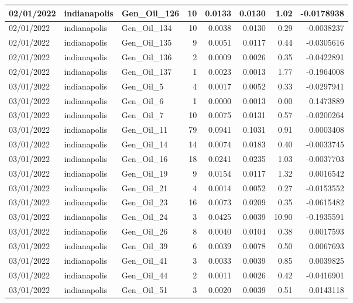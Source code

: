 \documentclass[
  letterpaper,
  DIV=11,
  numbers=noendperiod]{scrartcl}
\begin{document}
\begin{tabular}{l|l|l|r|r|r|r|r}
\hline
02/01/2022 & indianapolis & Gen\_Oil\_126 & 10 & 0.0133 & 0.0130 & 1.02 & -0.0178938\\
\hline
02/01/2022 & indianapolis & Gen\_Oil\_134 & 10 & 0.0038 & 0.0130 & 0.29 & -0.0038237\\
\hline
02/01/2022 & indianapolis & Gen\_Oil\_135 & 9 & 0.0051 & 0.0117 & 0.44 & -0.0305616\\
\hline
02/01/2022 & indianapolis & Gen\_Oil\_136 & 2 & 0.0009 & 0.0026 & 0.35 & -0.0422891\\
\hline
02/01/2022 & indianapolis & Gen\_Oil\_137 & 1 & 0.0023 & 0.0013 & 1.77 & -0.1964008\\
\hline
03/01/2022 & indianapolis & Gen\_Oil\_5 & 4 & 0.0017 & 0.0052 & 0.33 & -0.0297941\\
\hline
03/01/2022 & indianapolis & Gen\_Oil\_6 & 1 & 0.0000 & 0.0013 & 0.00 & 0.1473889\\
\hline
03/01/2022 & indianapolis & Gen\_Oil\_7 & 10 & 0.0075 & 0.0131 & 0.57 & -0.0200264\\
\hline
03/01/2022 & indianapolis & Gen\_Oil\_11 & 79 & 0.0941 & 0.1031 & 0.91 & 0.0003408\\
\hline
03/01/2022 & indianapolis & Gen\_Oil\_14 & 14 & 0.0074 & 0.0183 & 0.40 & -0.0033745\\
\hline
03/01/2022 & indianapolis & Gen\_Oil\_16 & 18 & 0.0241 & 0.0235 & 1.03 & -0.0037703\\
\hline
03/01/2022 & indianapolis & Gen\_Oil\_19 & 9 & 0.0154 & 0.0117 & 1.32 & 0.0016542\\
\hline
03/01/2022 & indianapolis & Gen\_Oil\_21 & 4 & 0.0014 & 0.0052 & 0.27 & -0.0153552\\
\hline
03/01/2022 & indianapolis & Gen\_Oil\_23 & 16 & 0.0073 & 0.0209 & 0.35 & -0.0615482\\
\hline
03/01/2022 & indianapolis & Gen\_Oil\_24 & 3 & 0.0425 & 0.0039 & 10.90 & -0.1935591\\
\hline
03/01/2022 & indianapolis & Gen\_Oil\_26 & 8 & 0.0040 & 0.0104 & 0.38 & 0.0017593\\
\hline
03/01/2022 & indianapolis & Gen\_Oil\_39 & 6 & 0.0039 & 0.0078 & 0.50 & 0.0067693\\
\hline
03/01/2022 & indianapolis & Gen\_Oil\_41 & 3 & 0.0033 & 0.0039 & 0.85 & 0.0039825\\
\hline
03/01/2022 & indianapolis & Gen\_Oil\_44 & 2 & 0.0011 & 0.0026 & 0.42 & -0.0416901\\
\hline
03/01/2022 & indianapolis & Gen\_Oil\_51 & 3 & 0.0020 & 0.0039 & 0.51 & 0.0143118\\

\end{tabular}
\end{document}

